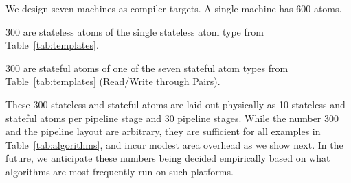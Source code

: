 We design seven \absmachine machines as compiler targets. A single \absmachine
machine has 600 atoms.
\begin{CompactEnumerate}
\item 300 are stateless atoms of the single stateless atom type from
Table~\ref{tab:templates}.
\item 300 are stateful atoms of one of the seven stateful atom types from
Table~\ref{tab:templates} (Read/Write through Pairs).
\end{CompactEnumerate}
These 300 stateless and stateful atoms are laid out physically as 10 stateless
and stateful atoms per pipeline stage and 30 pipeline stages. While the number
300 and the pipeline layout are arbitrary, they are sufficient for all examples
in Table~\ref{tab:algorithms}, and incur modest area overhead as we show next. In
the future, we anticipate these numbers being decided empirically based on what
algorithms are most frequently run on such platforms.

